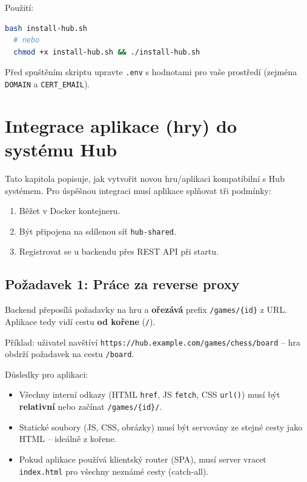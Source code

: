 \documentclass[12pt,a4paper]{article}
\begin{document}
Použití:

\begin{lstlisting}[language=bash]
  bash install-hub.sh
  # nebo
  chmod +x install-hub.sh && ./install-hub.sh
\end{lstlisting}

\begin{warnbox}
Před spuštěním skriptu upravte \texttt{.env} s hodnotami pro vaše prostředí (zejména \texttt{DOMAIN} a \texttt{CERT\_EMAIL}).
\end{warnbox}

\clearpage
\section{Integrace aplikace (hry) do systému Hub}

Tato kapitola popisuje, jak vytvořit novou hru/aplikaci kompatibilní s Hub systémem. Pro úspěšnou integraci musí aplikace splňovat tři podmínky:

\begin{enumerate}[label=\arabic*.]
  \item Běžet v Docker kontejneru.
  \item Být připojena na sdílenou síť \texttt{hub-shared}.
  \item Registrovat se u backendu přes REST API při startu.
\end{enumerate}

\subsection{Požadavek 1: Práce za reverse proxy}
\label{sec:revproxy}

Backend přeposílá požadavky na hru a \textbf{ořezává} prefix \texttt{/games/\{id\}} z URL. Aplikace tedy vidí cestu \textbf{od kořene} (\texttt{/}).

\begin{infobox}
Příklad: uživatel navštíví \texttt{https://hub.example.com/games/chess/board} -- hra obdrží požadavek na cestu \texttt{/board}.
\end{infobox}

Důsledky pro aplikaci:

\begin{itemize}
  \item Všechny interní odkazy (HTML \texttt{href}, JS \texttt{fetch}, CSS \texttt{url()}) musí být \textbf{relativní} nebo začínat \texttt{/games/\{id\}/}.
  \item Statické soubory (JS, CSS, obrázky) musí být servovány ze stejné cesty jako HTML -- ideálně z kořene.
  \item Pokud aplikace používá klientský router (SPA), musí server vracet \texttt{index.html} pro všechny neznámé cesty (catch-all).
\end{itemize}
\end{document}
